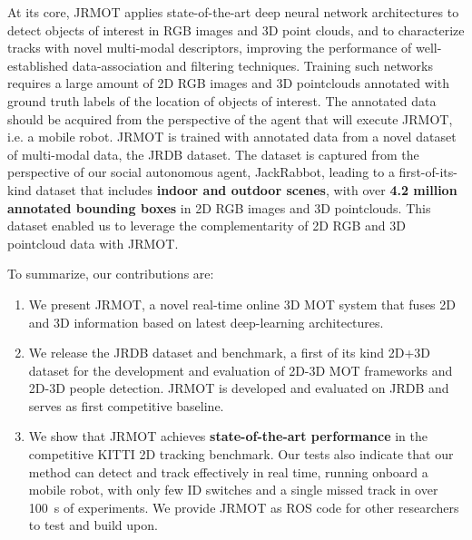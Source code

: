 \documentclass[letterpaper, 10 pt, conference]{ieeeconf}
\newcommand{\jrdb}{JRDB\xspace}
\newcommand{\jackrabbot}{JackRabbot\xspace}
\newcommand{\methodname}{{JRMOT}\xspace}
\begin{document}
At its core, \methodname applies state-of-the-art deep neural network architectures to detect objects of interest in RGB images and 3D point clouds, and to characterize tracks with novel multi-modal descriptors, improving the performance of well-established data-association and filtering techniques. Training such networks requires a large amount of 2D RGB images and 3D pointclouds annotated with ground truth labels of the location of objects of interest. The annotated data should be acquired from the perspective of the agent that will execute \methodname, i.e. a mobile robot. \methodname is trained with annotated data from a novel dataset of multi-modal data, the \jrdb dataset. 
The dataset is captured from the perspective of our social autonomous agent, \jackrabbot, leading to a first-of-its-kind dataset that includes \textbf{indoor and outdoor scenes}, with over \textbf{4.2 million annotated bounding boxes} in 2D RGB images and 3D pointclouds.
This dataset enabled us to leverage the complementarity of 2D RGB and 3D pointcloud data with \methodname. 

To summarize, our contributions are:
\begin{enumerate}[leftmargin=*]
\itemsep0em 
    \item We present \methodname, a novel real-time online 3D MOT system that fuses 2D and 3D information based on latest deep-learning architectures. 
    \item We release the \jrdb dataset and benchmark, a first of its kind 2D+3D dataset for the development and evaluation of 2D-3D MOT frameworks and 2D-3D people detection. \methodname is developed and evaluated on \jrdb and serves as first competitive baseline.
    \item We show that \methodname achieves \textbf{state-of-the-art performance} in the competitive KITTI 2D tracking benchmark. Our tests also indicate that our method can detect and track effectively in real time, running onboard a mobile robot, with only few ID switches and a single missed track in over \SI{100}{\second} of experiments. We provide \methodname as ROS code for other researchers to test and build upon.
\end{enumerate}
\end{document}
